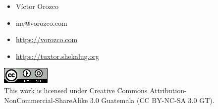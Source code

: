 \documentclass[aspectratio=169]{beamer}
\begin{document}
\begin{frame}
\begin{columns}[T]
\begin{column}[T]{4cm}
\begin{figure}
            \end{figure}
        \end{column}
        \begin{column}[T]{6cm} %
            \begin{itemize}
             \item Víctor Orozco
                \item me@vorozco.com
                \item \href{https://vorozco.com}{https://vorozco.com}
                \item \href{https://tuxtor.shekalug.org}{https://tuxtor.shekalug.org}
            \end{itemize}
            \begin{center}
                \includegraphics[width=0.1\linewidth]{Images/cclogo}
                \\
                This work is licensed under Creative Commons Attribution-NonCommercial-ShareAlike 3.0 Guatemala (CC BY-NC-SA 3.0 GT).
            \end{center}
        \end{column}
    \end{columns}
\end{frame}
\end{document}
